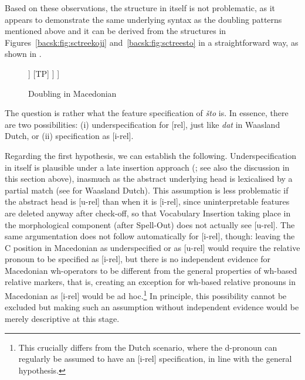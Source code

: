 \documentclass[output=paper]{langscibook}
\begin{document}
Based on these observations, the structure in itself is not problematic, as it appears to demonstrate the same underlying syntax as the doubling patterns mentioned above and it can be derived from the structures in Figures~\ref{bacsk:fig:sctreekoji} and~\ref{bacsk:fig:sctreesto} in a straightforward way, as shown in .

\begin{figure}
\caption{Doubling in Macedonian}
\label{bacsk:fig:treekojsto}
\begin{forest}
[CP
	[koj]
	[C$'$
		[C [što]]
		[TP]
	]
]
\end{forest}
\end{figure}

The question is rather what the feature specification of \textit{što} is. In essence, there are two possibilities: (i) underspecification for [rel], just like \textit{dat} in Waasland Dutch, or (ii) specification as [i-rel]. 

Regarding the first hypothesis, we can establish the following. Underspecification in itself is plausible under a late insertion approach (\citealt{hallemarantz1993}; see also the discussion in this section above), inasmuch as the abstract underlying head is lexicalised by a partial match (see  for Waasland Dutch). This assumption is less problematic if the abstract head is [u-rel] than when it is [i-rel], since uninterpretable features are deleted anyway after check-off, so that Vocabulary Insertion taking place in the morphological component (after Spell-Out) does not actually see [u-rel]. The same argumentation does not follow automatically for [i-rel], though: leaving the C position in Macedonian as underspecified or as [u-rel] would require the relative pronoun to be specified as [i-rel], but there is no independent evidence for Macedonian wh-operators to be different from the general properties of wh-based relative markers, that is, creating an exception for wh-based relative pronouns in Macedonian as [i-rel] would be ad hoc.\footnote{This crucially differs from the Dutch scenario, where the d-pronoun can regularly be assumed to have an [i-rel] specification, in line with the general hypothesis.} In principle, this possibility cannot be excluded but making such an assumption without independent evidence would be merely descriptive at this stage.
\end{document}
